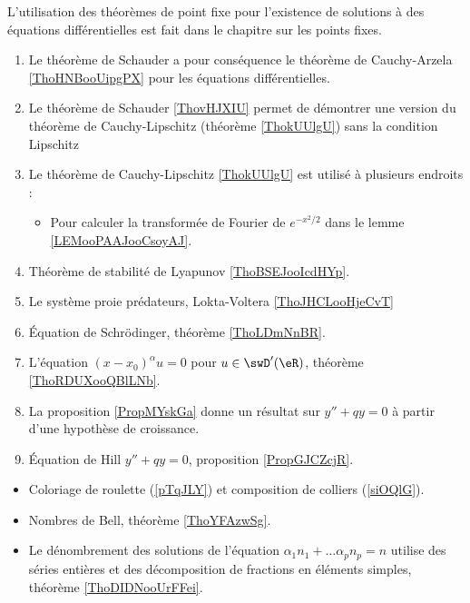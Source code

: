 L'utilisation des théorèmes de point fixe pour l'existence de solutions à des équations différentielles est fait dans le chapitre sur les points fixes.
\begin{enumerate}
    \item
            Le théorème de Schauder a pour conséquence le théorème de Cauchy-Arzela \ref{ThoHNBooUipgPX} pour les équations différentielles.
        \item
            Le théorème de Schauder \ref{ThovHJXIU} permet de démontrer une version du théorème de Cauchy-Lipschitz (théorème \ref{ThokUUlgU}) sans la condition Lipschitz
        \item
            Le théorème de Cauchy-Lipschitz \ref{ThokUUlgU} est utilisé à plusieurs endroits :
            \begin{itemize}
                \item 
                    Pour calculer la transformée de Fourier de \(  e^{-x^2/2}\) dans le lemme \ref{LEMooPAAJooCsoyAJ}.
            \end{itemize}
    \item
        Théorème de stabilité de Lyapunov \ref{ThoBSEJooIcdHYp}.
    \item
        Le système proie prédateurs, Lokta-Voltera \ref{ThoJHCLooHjeCvT}
    \item 
        Équation de Schrödinger, théorème \ref{ThoLDmNnBR}.
    \item 
        L'équation \( (x-x_0)^{\alpha}u=0\) pour \( u\in\swD'(\eR)\), théorème \ref{ThoRDUXooQBlLNb}.
    \item 
        La proposition \ref{PropMYskGa} donne un résultat sur \( y''+qy=0\) à partir d'une hypothèse de croissance.
    \item
        Équation de Hill \( y''+qy=0\), proposition \ref{PropGJCZcjR}.
\end{enumerate}

\begin{itemize}
    \item Coloriage de roulette (\ref{pTqJLY}) et composition de colliers (\ref{siOQlG}).
    \item Nombres de Bell, théorème \ref{ThoYFAzwSg}.
    \item Le dénombrement des solutions de l'équation \( \alpha_1 n_1+\ldots \alpha_pn_p=n\) utilise des séries entières et des décomposition de fractions en éléments simples, théorème \ref{ThoDIDNooUrFFei}.
\end{itemize}

